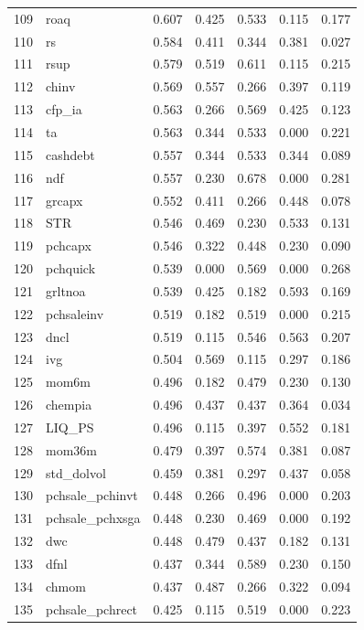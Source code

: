 \begin{footnotesize}
\begin{longtable}{rl|c|c|c|c|c}
  109 & roaq & 0.607 & 0.425 & 0.533 & 0.115 & 0.177 \\ 
  110 & rs & 0.584 & 0.411 & 0.344 & 0.381 & 0.027 \\ 
  111 & rsup & 0.579 & 0.519 & 0.611 & 0.115 & 0.215 \\ 
  112 & chinv & 0.569 & 0.557 & 0.266 & 0.397 & 0.119 \\ 
  113 & cfp\_ia & 0.563 & 0.266 & 0.569 & 0.425 & 0.123 \\ 
  114 & ta & 0.563 & 0.344 & 0.533 & 0.000 & 0.221 \\ 
  115 & cashdebt & 0.557 & 0.344 & 0.533 & 0.344 & 0.089 \\ 
  116 & ndf & 0.557 & 0.230 & 0.678 & 0.000 & 0.281 \\ 
  117 & grcapx & 0.552 & 0.411 & 0.266 & 0.448 & 0.078 \\ 
  118 & STR & 0.546 & 0.469 & 0.230 & 0.533 & 0.131 \\ 
  119 & pchcapx & 0.546 & 0.322 & 0.448 & 0.230 & 0.090 \\ 
  120 & pchquick & 0.539 & 0.000 & 0.569 & 0.000 & 0.268 \\ 
  121 & grltnoa & 0.539 & 0.425 & 0.182 & 0.593 & 0.169 \\ 
  122 & pchsaleinv & 0.519 & 0.182 & 0.519 & 0.000 & 0.215 \\ 
  123 & dncl & 0.519 & 0.115 & 0.546 & 0.563 & 0.207 \\ 
  124 & ivg & 0.504 & 0.569 & 0.115 & 0.297 & 0.186 \\ 
  125 & mom6m & 0.496 & 0.182 & 0.479 & 0.230 & 0.130 \\ 
  126 & chempia & 0.496 & 0.437 & 0.437 & 0.364 & 0.034 \\ 
  127 & LIQ\_PS & 0.496 & 0.115 & 0.397 & 0.552 & 0.181 \\ 
  128 & mom36m & 0.479 & 0.397 & 0.574 & 0.381 & 0.087 \\ 
  129 & std\_dolvol & 0.459 & 0.381 & 0.297 & 0.437 & 0.058 \\ 
  130 & pchsale\_pchinvt & 0.448 & 0.266 & 0.496 & 0.000 & 0.203 \\ 
  131 & pchsale\_pchxsga & 0.448 & 0.230 & 0.469 & 0.000 & 0.192 \\ 
  132 & dwc & 0.448 & 0.479 & 0.437 & 0.182 & 0.131 \\ 
  133 & dfnl & 0.437 & 0.344 & 0.589 & 0.230 & 0.150 \\ 
  134 & chmom & 0.437 & 0.487 & 0.266 & 0.322 & 0.094 \\ 
  135 & pchsale\_pchrect & 0.425 & 0.115 & 0.519 & 0.000 & 0.223 \\ 

\end{longtable}
\end{footnotesize}
